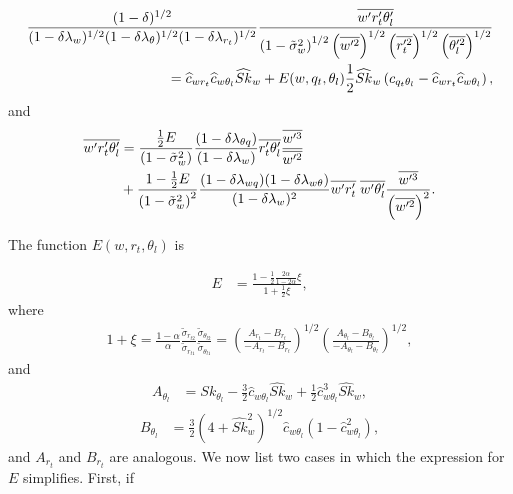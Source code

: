 \begin{align}
    \label{eq:wprtpthlp_div_wp2_thp2_rt2_sk_w}
    \frac{(1-\delta)^{1/2}}{(1-\delta \lambda_w)^{1/2} (1-\delta \lambda_\theta)^{1/2} (1-\delta \lambda_{r_t})^{1/2}} \frac{\overline{w' r_t' \theta_l'}}{\left( 1 - \tilde{\sigma}_w^2 \right)^{1/2} \left( \overline{w'^2} \right)^{1/2} \left(\overline{r_t'^2}\right)^{1/2} \left(\overline{\theta_l'^2}\right)^{1/2}} \nonumber \\
    = \widehat{c}_{wr_t} \widehat{c}_{w\theta_l} \widehat{Sk}_w + E(w,q_t,\theta_l) \frac{1}{2} \widehat{Sk}_w \left( c_{q_t\theta_l} - \widehat{c}_{wr_t} \widehat{c}_{w\theta_l}\right),
\end{align}
and
\begin{align}
    \label{eq:wprtpthlp_E}
    \overline{w' r_t' \theta_l'}
    &= \frac{\frac{1}{2} E}{\left( 1 - \tilde{\sigma}_w^2 \right)} \frac{(1-\delta \lambda_{\theta q})} {(1 - \delta \lambda_w)} \overline{r_t' \theta_l'} \frac{\overline{w'^3}}{\overline{w'^2}} \nonumber\\
    &+ \frac{1 - \frac{1}{2} E}{\left( 1 - \tilde{\sigma}_w^2 \right)^2} \frac{(1-\delta \lambda_{w q})(1-\delta \lambda_{w \theta})}{(1 - \delta \lambda_w)^2} \overline{w' r_t'} \; \overline{w' \theta_l'} \frac{\overline{w'^3}}{\left( \overline{w'^2} \right)^2}.
\end{align}

The function $E(w,r_t,\theta_l)$ is

\begin{align}
    \label{eq:E}
    E &= \frac{1 - \frac{1}{2} \frac{2\alpha}{1-2\alpha} \xi}{1 + \frac{1}{2} \xi},
\end{align}
where
\begin{align}
    1 + \xi
    = \frac{1-\alpha}{\alpha} \frac{\tilde{\sigma}_{r_{t2}}}{\tilde{\sigma}_{r_{t1}}} \frac{ \tilde{\sigma}_{\theta_{l2}}}{\tilde{\sigma}_{\theta_{l1}}}
    = \left(\frac{A_{r_t} - B_{r_t}}{-A_{r_t} - B_{r_t}}\right)^{1/2} \left(\frac{A_{\theta_l} - B_{\theta_l}}{-A_{\theta_l} - B_{\theta_l}}\right)^{1/2},
\end{align}
and
\begin{align}
    \label{eq:A_thl}
    A_{\theta_l}
    &= Sk_{\theta_l} - \frac{3}{2} \widehat{c}_{w\theta_l} \widehat{Sk}_w + \frac{1}{2} \widehat{c}_{w\theta_l}^3 \widehat{Sk}_w,
\end{align}
\begin{align}
    B_{\theta_l}
    &= \frac{3}{2} \left(4 + \widehat{Sk}_w^2 \right)^{1/2} \widehat{c}_{w\theta_l} \left(1 - \widehat{c}_{w\theta_l}^2\right),
\end{align}
and $A_{r_t}$ and $B_{r_t}$ are analogous.
We now list two cases in which the expression for $E$ simplifies.
First, if

